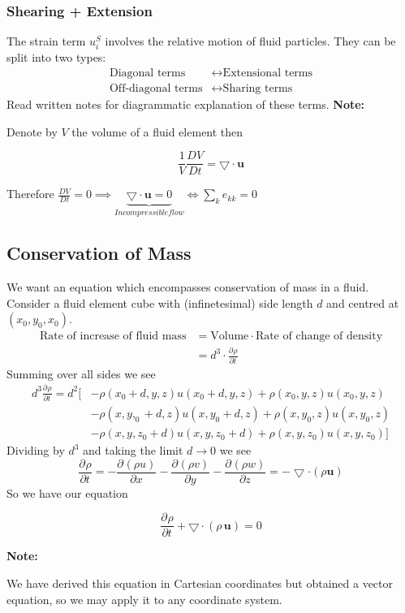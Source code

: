 \documentclass[11pt]{article}
\newcommand*{\pd}[3][]{\ensuremath{\frac{\partial^{#1} {#2}}{\partial {#3}^{#1}}}}
\newcommand*{\md}[1]{\ensuremath{\frac{D #1}{D t}}}
\newcommand{\grad}{\bigtriangledown}
\newcommand{\mv}[1]{\bm{#1}}
\newenvironment{note}
    {\textbf{Note:}\begin{mdframed}[backgroundcolor=white, roundcorner=5pt, linewidth=0pt]}
    {\end{mdframed}}
\newenvironment{formula}
	{\begin{mdframed}[backgroundcolor=white, roundcorner=5pt, linewidth=1pt, linecolor=red]}
	{\end{mdframed}}
\begin{document}
\subsubsection{Shearing + Extension}
The strain term $u_i^S$ involves the relative motion of fluid particles. They can be split into two types:
\begin{align*}
    \text{Diagonal terms} &\longleftrightarrow \text{Extensional terms}\\
    \text{Off-diagonal terms} &\longleftrightarrow \text{Sharing terms}
\end{align*}
Read written notes for diagrammatic explanation of these terms.
\begin{note}
Denote by $V$ the volume of a fluid element then
\begin{formula}
$$\frac{1}{V}\md{V} = \grad\cdot\mv{u}$$
\end{formula}
Therefore $\md{V}=0\implies\underbrace{\grad\cdot\mv{u}=0}_{Incompressible flow}\iff\sum_k e_{kk}=0$
\end{note}

\subsection{Conservation of Mass}
We want an equation which encompasses conservation of mass in a fluid. Consider a fluid element cube with (infinetesimal) side length $d$ and centred at $(x_0,y_0,x_0)$.
\begin{align*}
    \text{Rate of increase of fluid mass} &= \text{Volume} \cdot \text{Rate of change of density}\\
    &= d^3 \cdot \pd{\rho}{t}
\end{align*}
Summing over all sides we see
\begin{align*}
d^3\pd{\rho}{t}=d^2[&-\rho(x_0+d,y,z)u(x_0+d,y,z)+\rho(x_0,y,z)u(x_0,y,z)\\
                    &-\rho(x,y,_0+d,z)u(x,y_0+d,z)+\rho(x,y_0,z)u(x,y_0,z)\\
                    &-\rho(x,y,z_0+d)u(x,y,z_0+d)+\rho(x,y,z_0)u(x,y,z_0)]
\end{align*}
Dividing by $d^3$ and taking the limit $d\to 0$ we see
$$\pd{\rho}{t}=-\pd{(\rho u)}{x} - \pd{(\rho v)}{y} - \pd{(\rho w)}{z} = -\grad\cdot(\rho\mv{u})$$
So we have our equation
\begin{formula}
$$\pd{\rho}{t}+\grad\cdot(\rho\,\mv{u})=0$$
\end{formula}
\begin{note}
	We have derived this equation in Cartesian coordinates but obtained a vector equation, so we may apply it to any coordinate system.
\end{note}
\end{document}
